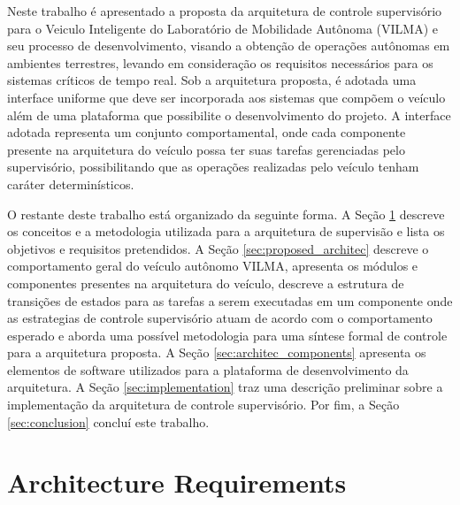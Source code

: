 \documentclass[conference]{IEEEtran}
\begin{document}
Neste trabalho é apresentado a proposta da arquitetura de controle supervisório para o Veiculo Inteligente do Laboratório de Mobilidade Autônoma (VILMA) \cite{lma_vilma_website} e seu processo de desenvolvimento, visando a obtenção de operações autônomas em ambientes terrestres, levando em consideração os requisitos necessários para os sistemas críticos de tempo real. Sob a arquitetura proposta, é adotada uma interface uniforme que deve ser incorporada aos sistemas que compõem o veículo além de uma plataforma que possibilite o desenvolvimento do projeto. A interface adotada representa um conjunto comportamental, onde cada componente presente na arquitetura do veículo possa ter suas tarefas gerenciadas pelo supervisório, possibilitando que as operações realizadas pelo veículo tenham caráter determinísticos.

O restante deste trabalho está organizado da seguinte forma. A Seção \ref{sec:architec_riquirements} descreve os conceitos e a metodologia utilizada para a arquitetura de supervisão e lista os objetivos e requisitos pretendidos. A Seção \ref{sec:proposed_architec} descreve o comportamento geral do veículo autônomo VILMA, apresenta os módulos e componentes presentes na arquitetura do veículo, descreve a estrutura de transições de estados para as tarefas a serem executadas em um componente onde as estrategias de controle supervisório atuam de acordo com o comportamento esperado e aborda uma possível metodologia para uma síntese formal de controle para a arquitetura proposta. A Seção \ref{sec:architec_components} apresenta os elementos de software utilizados para a plataforma de desenvolvimento da arquitetura. A Seção \ref{sec:implementation} traz uma descrição preliminar sobre a implementação da arquitetura de controle supervisório. Por fim, a Seção \ref{sec:conclusion} concluí este trabalho.

\section{Architecture Requirements}\label{sec:architec_riquirements}

\end{document}
